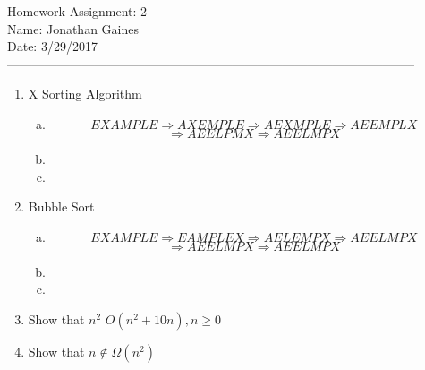 \documentclass[12pt]{article}
\begin{document}
Homework Assignment: 2\\ 
Name: Jonathan Gaines\\ 
Date: 3/29/2017\\ --------------------------------------------------------------------------------------------------
\begin {enumerate}
\item X Sorting Algorithm
	\begin {enumerate}[(a)]
		\item
		$$EXAMPLE\Rightarrow 
			AXEMPLE\Rightarrow	
			AEXMPLE\Rightarrow
			AEEMPLX$$ $$\Rightarrow 
		  AEELPMX\Rightarrow
			AEELMPX $$		
		\item
		\item 
	\end {enumerate}
\item Bubble Sort
	\begin {enumerate}[(a)]
		\item
		$$EXAMPLE\Rightarrow 
			EAMPLEX\Rightarrow	
			AELEMPX\Rightarrow
			AEELMPX$$ $$\Rightarrow
			AEELMPX\Rightarrow
			AEELMPX $$
		\item
		\item
	\end {enumerate}
\item Show that $n^{2}$ \in $O(n^{2}+10n), n \geq 0$

\item Show that $n \not\in \Omega(n^{2})$

\end {enumerate}
\end{document}
